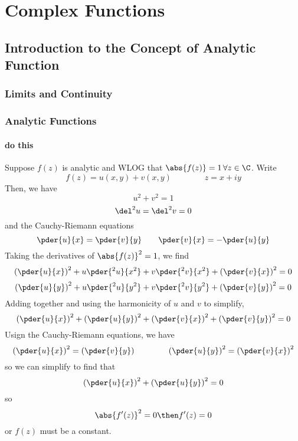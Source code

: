 \chapter{Complex Functions}\label{ch:cfn}
\section{Introduction to the Concept of Analytic Function}
\subsection{Limits and Continuity}

\subsection{Analytic Functions}
\subsubsection{}
\subsubsection{}
\subsubsection{}
\subsubsection{do this}
Suppose \(f(z)\) is analytic and WLOG that \(\abs{f(z)}=1\,\forall z\in\C\).
Write
\[f(z)=u(x,y)+v(x,y)\qquad\qquad z=x+iy\]
Then, we have 
\[u^2+v^2=1\]
\[\del^2u=\del^2v=0\]
and the Cauchy-Riemann equations
\[\pder{u}{x} =\pder{v}{y}\qquad\pder{v}{x}=-\pder{u}{y}\]
Taking the derivatives of \(\abs{f(z)}^2=1\), we find
\[\left(\pder{u}{x}\right)^2+u\pder{^2u}{x^2}+v\pder{^2v}{x^2}+\left(\pder{v}{x}\right)^2=0\]
\[\left(\pder{u}{y}\right)^2+u\pder{^2u}{y^2}+v\pder{^2v}{y^2}+\left(\pder{v}{y}\right)^2=0\]
Adding together and using the harmonicity of \(u\) and \(v\) to simplify,
\[\left(\pder{u}{x}\right)^2+\left(\pder{u}{y}\right)^2+\left(\pder{v}{x}\right)^2+\left(\pder{v}{y}\right)^2=0\]
Usign the Cauchy-Riemann equations, we have
\[\left(\pder{u}{x}\right)^2 = \left(\pder{v}{y}\right)\qquad\qquad\left(\pder{u}{y}\right)^2=\left(\pder{v}{x}\right)^2\]
so we can simplify to find that
\[\left(\pder{u}{x}\right)^2+\left(\pder{u}{y}\right)^2=0\]
so
\[\abs{f'(z)}^2=0\then f'(z)=0\]
or \(f(z)\) must be a constant.
